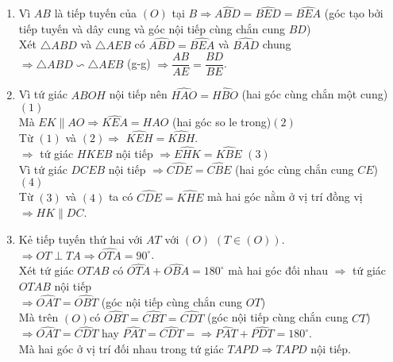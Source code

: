 \begin{ex}
{\begin{enumerate}
Xét tứ giác $ABOH$ có $\widehat{OHA}+\widehat{OBA}=90^\circ+90^\circ=180^\circ\Rightarrow$ tứ giác $ABOH$ nội tiếp.
\item Vì $AB$ là tiếp tuyến của $(O)$ tại $B\Rightarrow\widehat{ABD}=\widehat{BED}=\widehat{BEA}$ (góc tạo bởi tiếp tuyến và dây cung và góc nội tiếp cùng chắn cung $BD$)\\
Xét $\triangle ABD$ và $\triangle AEB$ có $\widehat{ABD}=\widehat{BEA}$ và $\widehat{BAD}$ chung\\
$\Rightarrow\triangle ABD\backsim\triangle AEB$ (g-g) $\Rightarrow\dfrac{AB}{AE}=\dfrac{BD}{BE}$.\\
\item Vì tứ giác $ABOH$ nội tiếp nên $\widehat{HAO}=\widehat{HBO}$ (hai góc cùng chắn một cung)\hspace{1cm} $(1)$\\
Mà $EK\parallel AO\Rightarrow\widehat{KEA}=\widehat{HAO}$ (hai góc so le trong)\hspace{1cm}$(2)$\\
Từ $(1)$ và $(2)\Rightarrow$ $\widehat{KEH}=\widehat{KBH}$.\\
$\Rightarrow$ tứ giác $HKEB$ nội tiếp $\Rightarrow\widehat{EHK}=\widehat{KBE}$\hspace{1cm} $(3)$\\
Vì tứ giác $DCEB$ nội tiếp $\Rightarrow\widehat{CDE}=\widehat{CBE}$ (hai góc cùng chắn cung $CE$)\hspace{1cm} $(4)$\\
Từ $(3)$ và $(4)$ ta có $\widehat{CDE}=\widehat{KHE}$ mà hai góc nằm ở vị trí đồng vị $\Rightarrow HK\parallel DC$.
\item Kẻ tiếp tuyến thứ hai với $AT$ với $(O)$ $(T\in (O))$.\\
$\Rightarrow OT\perp TA\Rightarrow\widehat{OTA}=90^\circ$.\\
Xét tứ giác $OTAB$ có $\widehat{OTA}+\widehat{OBA}=180^\circ$ mà hai góc đối nhau $\Rightarrow$ tứ giác $OTAB$ nội tiếp\\
$\Rightarrow \widehat{OAT}=\widehat{OBT} $ (góc nội tiếp cùng chắn cung $OT$)\\
Mà trên $(O)$có $\widehat{OBT}=\widehat{CBT}=\widehat{CDT}$ (góc nội tiếp cùng chắn cung $CT$)\\
$\Rightarrow\widehat{OAT}=\widehat{CDT}$ hay $\widehat{PAT}=\widehat{CDT}=\Rightarrow\widehat{PAT}+\widehat{PDT}=180^\circ$.\\
Mà hai góc ở vị trí đối nhau trong tứ giác $TAPD\Rightarrow TAPD $ nội tiếp.\\

\end{enumerate}}
\end{ex}
